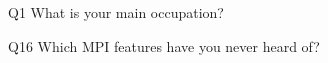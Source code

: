 \begin{description}%
\item{Q1} What is your main occupation?%
\item{Q16} Which MPI features have you never heard of?%
\end{description}%
